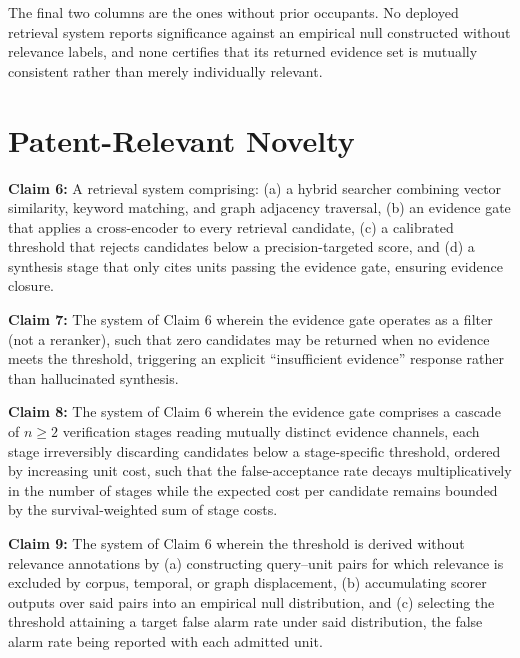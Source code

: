 The final two columns are the ones without prior occupants. No deployed retrieval system reports significance against an empirical null constructed without relevance labels, and none certifies that its returned evidence set is mutually consistent rather than merely individually relevant.

\section{Patent-Relevant Novelty}
\label{sec:retrieval:patent}

\begin{patentclaim}
\textbf{Claim 6:} A retrieval system comprising: (a) a hybrid searcher combining vector similarity, keyword matching, and graph adjacency traversal, (b) an evidence gate that applies a cross-encoder to every retrieval candidate, (c) a calibrated threshold that rejects candidates below a precision-targeted score, and (d) a synthesis stage that only cites units passing the evidence gate, ensuring evidence closure.
\end{patentclaim}

\begin{patentclaim}
\textbf{Claim 7:} The system of Claim 6 wherein the evidence gate operates as a filter (not a reranker), such that zero candidates may be returned when no evidence meets the threshold, triggering an explicit ``insufficient evidence'' response rather than hallucinated synthesis.
\end{patentclaim}

\begin{patentclaim}
\textbf{Claim 8:} The system of Claim 6 wherein the evidence gate comprises a cascade of $n \geq 2$ verification stages reading mutually distinct evidence channels, each stage irreversibly discarding candidates below a stage-specific threshold, ordered by increasing unit cost, such that the false-acceptance rate decays multiplicatively in the number of stages while the expected cost per candidate remains bounded by the survival-weighted sum of stage costs.
\end{patentclaim}

\begin{patentclaim}
\textbf{Claim 9:} The system of Claim 6 wherein the threshold is derived without relevance annotations by (a) constructing query--unit pairs for which relevance is excluded by corpus, temporal, or graph displacement, (b) accumulating scorer outputs over said pairs into an empirical null distribution, and (c) selecting the threshold attaining a target false alarm rate under said distribution, the false alarm rate being reported with each admitted unit.
\end{patentclaim}

